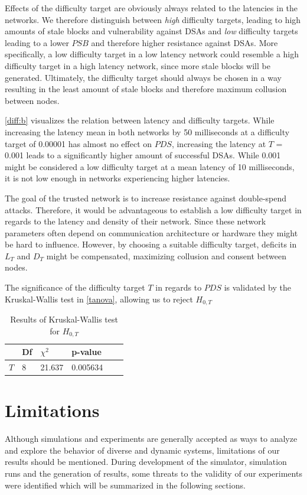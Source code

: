 \documentclass[a4paper,12pt,twoside]{report}
\begin{document}
Effects of the difficulty target are obviously always related to the latencies in the networks. We therefore distinguish between \textit{high} difficulty targets, leading to high amounts of stale blocks and vulnerability against DSAs and \textit{low} difficulty targets leading to a lower $PSB$ and therefore higher resistance against DSAs. More specifically, a low difficulty target in a low latency network could resemble a high difficulty target in a high latency network, since more stale blocks will be generated. Ultimately, the difficulty target should always be chosen in a way resulting in the least amount of stale blocks and therefore maximum collusion between nodes.

\autoref{diff:b} visualizes the relation between latency and difficulty targets. While increasing the latency mean in both networks by 50 milliseconds at a difficulty target of 0.00001 has almost no effect on $PDS$, increasing the latency at $T$ = 0.001 leads to a significantly higher amount of successful DSAs. While 0.001 might be considered a low difficulty target at a mean latency of 10 milliseconds, it is not low enough in networks experiencing higher latencies. 

The goal of the trusted network is to increase resistance against double-spend attacks. Therefore, it would be advantageous to establish a low difficulty target in regards to the latency and density of their network. Since these network parameters often depend on communication architecture or hardware they might be hard to influence. However, by choosing a suitable difficulty target, deficits in $L_{T}$ and $D_{T}$ might be compensated, maximizing collusion and consent between nodes.

The significance of the difficulty target $T$ in regards to $PDS$ is validated by the Kruskal-Wallis test in \autoref{tanova}, allowing us to reject $H_{0,T}$
\begin{table}[hb]
\centering
\begin{tabular}{|l|l|l|l|l|l|} \hline
& Df & $\chi^{2}$ & p-value \\ \hline
$T$ & 8 &  21.637 & 0.005634 \\ \hline
\end{tabular}
\caption{Results of Kruskal-Wallis test for $H_{0,T}$}
\label{tanova}
\end{table}

\section{Limitations} \label{limits}
Although simulations and experiments are generally accepted as ways to analyze
and explore the behavior of diverse and dynamic systems, limitations of our results should be mentioned. During development of the simulator, simulation runs and the generation of results, some threats to the validity of our experiments were identified which will be summarized in the following sections. 
\end{document}
